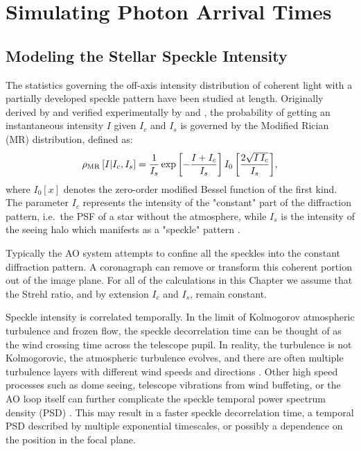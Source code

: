 \documentclass[../main.tex]{subfiles}
\begin{document}
\section{Simulating Photon Arrival Times} \label{sec:sim}

\subsection{Modeling the Stellar Speckle Intensity}
The statistics governing the off-axis intensity distribution of coherent light with a partially developed speckle pattern have been studied at length. Originally derived by \textcite{Goodman1975} and verified experimentally by \textcite{Cagigal_2001} and \textcite{fitzgerald_2006}, the probability of getting an instantaneous intensity $I$ given $I_c$ and $I_s$ is governed by the Modified Rician (MR) distribution, defined as:
\begin{equation}
    \rho_{\rm MR}\left[ I | I_c, I_s \right] = \frac{1}{I_s}\exp{\left[ - \frac{I + I_c}{I_s} \right] I_0 \left[ \frac{2 \sqrt{I\,I_c}}{I_s} \right]}, 
    \label{equ:mr}
\end{equation}
where $I_0[x]$ denotes the zero-order modified Bessel function of the first kind. The parameter $I_c$ represents the intensity of the "constant" part of the diffraction pattern, i.e.~the PSF of a star without the atmosphere, while $I_s$ is the intensity of the seeing halo which manifests as a "speckle" pattern \parencite{Canales1999, aime04b, Soummer_2007}.

Typically the AO system attempts to confine all the speckles into the constant diffraction pattern. A coronagraph can remove or transform this coherent portion out of the image plane. For all of the calculations in this Chapter we assume that the Strehl ratio, and by extension $I_c$ and $I_s$, remain constant. 

Speckle intensity is correlated temporally. In the limit of Kolmogorov atmospheric turbulence and frozen flow, the speckle decorrelation time can be thought of as the wind crossing time across the telescope pupil. In reality, the turbulence is not Kolmogorovic, the atmospheric turbulence evolves, and there are often multiple turbulence layers with different wind speeds and directions \parencite{Roddier_1982, Macintosh_2005}. Other high speed processes such as dome seeing, telescope vibrations from wind buffeting, or the AO loop itself can further complicate the speckle temporal power spectrum density (PSD) \parencite{Stangalini_2016}. This may result in a faster speckle decorrelation time, a temporal PSD described by multiple exponential timescales, or possibly a dependence on the position in the focal plane.
\end{document}
